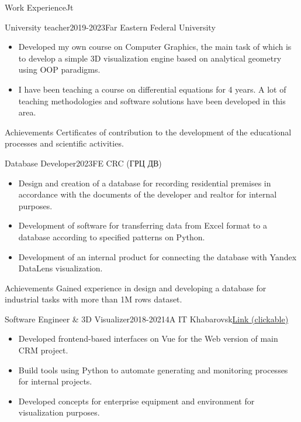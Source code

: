 \documentclass[10pt]{extarticle}
\begin{document}
	\begin{centralpart}{Work Experience}{J}{t}

		\begin{titleblock}{University teacher}{2019-2023}{Far Eastern Federal University}{}
			\begin{itemize}[label=$\circ$]
				\item Developed my own course on Computer Graphics, the main task of which is to develop a simple 3D visualization engine based on analytical geometry using OOP paradigms.
				\item I have been teaching a course on differential equations for 4 years. A lot of teaching methodologies and software solutions have been developed in this area.
			\end{itemize}
		\end{titleblock}

		\begin{additionalblock}{Achievements}
			Certificates of contribution to the development of the educational processes and scientific activities.
		\end{additionalblock}

		\begin{titleblock}{Database Developer}{2023}{FE CRC (ГРЦ ДВ)}{}
			\begin{itemize}[label=$\circ$]
				\item Design and creation of a database for recording residential premises in accordance with the documents of the developer and realtor for internal purposes.
				\item Development of software for transferring data from Excel format to a database according to specified patterns on Python.
				\item Development of an internal product for connecting the database with Yandex DataLens visualization.
			\end{itemize}
		\end{titleblock}

		\begin{additionalblock}{Achievements}
			Gained experience in design and developing a database for industrial tasks with more than 1M rows dataset.
		\end{additionalblock}

		\begin{titleblock}{Software Engineer \& 3D Visualizer}{2018-2021}{4A IT Khabarovsk}{\href{https://4ait.ru/}{Link (clickable)}}
			\begin{itemize}[label=$\circ$]
				\item Developed frontend-based interfaces on Vue for the Web version of main CRM project.
				\item Build tools using Python to automate generating and monitoring processes for internal projects.
				\item Developed concepts for enterprise equipment and environment for visualization purposes.
			\end{itemize}
		\end{titleblock}


\end{centralpart}
\end{document}
